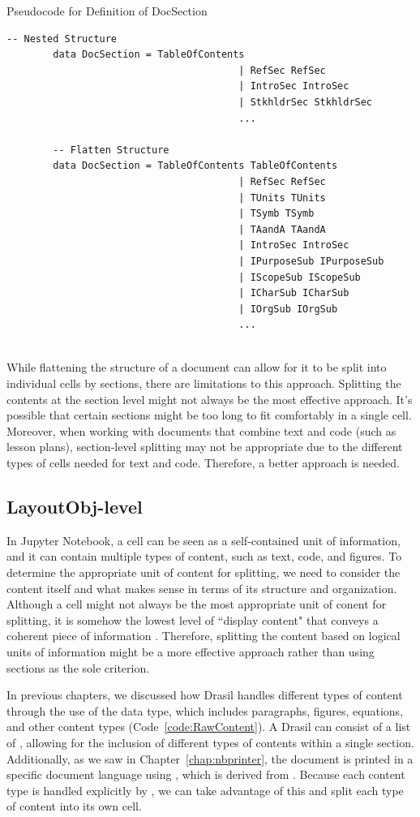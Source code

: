 \begin{listing}[h]
	\caption{Pseudocode for Definition of DocSection}
	\label{code:DocSection}
	\begin{lstlisting}[language=haskell1]
		-- Nested Structure
		data DocSection = TableOfContents
										| RefSec RefSec
										| IntroSec IntroSec
										| StkhldrSec StkhldrSec
										...
		
		-- Flatten Structure
		data DocSection = TableOfContents TableOfContents
										| RefSec RefSec
										| TUnits TUnits
										| TSymb TSymb
										| TAandA TAandA
										| IntroSec IntroSec
										| IPurposeSub IPurposeSub
										| IScopeSub IScopeSub
										| ICharSub ICharSub
										| IOrgSub IOrgSub
										...
		
	\end{lstlisting}
\end{listing}
 
While flattening the structure of a document can allow for it to be split into 
individual cells by sections, there are limitations to this approach. Splitting 
the contents at the section level might not always be the most effective 
approach. It's possible that certain sections might be too long to fit 
comfortably in a single cell. Moreover, when working with documents that 
combine text and code (such as lesson plans), section-level splitting may not 
be appropriate due to the different types of cells needed for text and code. 
Therefore, a better approach is needed.

\subsection{LayoutObj-level}
In Jupyter Notebook, a cell can be seen as a self-contained unit of 
information, and it can contain multiple types of content, such as text, code, 
and figures. To determine the appropriate unit of content for splitting, we 
need to consider the content itself and what makes sense in terms of its 
structure and organization.  Although a cell might not always be the most 
appropriate unit of conent for splitting, it is somehow the lowest level of 
``display content" that conveys a coherent piece of information 
\cite{cellsseparation}. Therefore, splitting the content based on logical units 
of information might be a more effective approach rather than using sections as 
the sole criterion. 

In previous chapters, we discussed how Drasil handles different types of 
content through the use of the  data type, which includes 
paragraphs, figures, equations, and other content types 
(Code~\ref{code:RawContent}). A Drasil  can consist of a list 
of , allowing for the inclusion of different types of 
contents within a single section. Additionally, as we saw in 
Chapter~\ref{chap:nbprinter}, the document is printed in a specific document 
language using , which is derived from . 
Because each content type is handled explicitly by , we can 
take advantage of this and split each type of content into its own cell.

